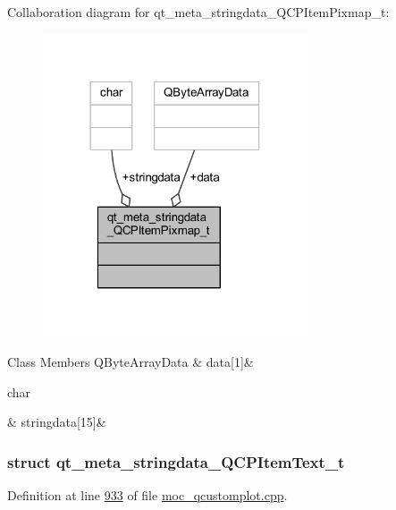 Collaboration diagram for qt\+\_\+meta\+\_\+stringdata\+\_\+\+Q\+C\+P\+Item\+Pixmap\+\_\+t\+:
\nopagebreak
\begin{figure}[H]
\begin{center}
\leavevmode
\includegraphics[width=222pt]{dd/d4c/a00177}
\end{center}
\end{figure}
\begin{DoxyFields}{Class Members}
\hypertarget{a00016_ac2c2965eddf58c85d34bd6a8bc3608fe}{Q\+Byte\+Array\+Data}\label{a00016_ac2c2965eddf58c85d34bd6a8bc3608fe}
&
data\mbox{[}1\mbox{]}&
\\
\hline

\hypertarget{a00016_a4cee80f7af4fafbb06fc161890ced10e}{char}\label{a00016_a4cee80f7af4fafbb06fc161890ced10e}
&
stringdata\mbox{[}15\mbox{]}&
\\
\hline

\end{DoxyFields}
\label{db/d57/a00112}
\hypertarget{a00016_db/d57/a00112}{}
\subsubsection{struct qt\+\_\+meta\+\_\+stringdata\+\_\+\+Q\+C\+P\+Item\+Text\+\_\+t}


Definition at line \hyperlink{a00016_source_l00933}{933} of file \hyperlink{a00016_source}{moc\+\_\+qcustomplot.\+cpp}.



